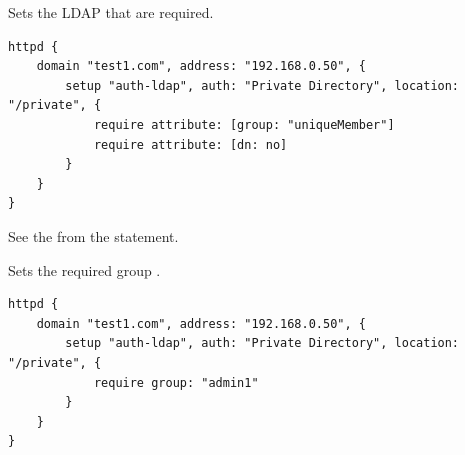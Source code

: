 Sets the LDAP  that are required.

\begin{lstlisting}[style=Java]
httpd {
    domain "test1.com", address: "192.168.0.50", {
        setup "auth-ldap", auth: "Private Directory", location: "/private", {
            require attribute: [group: "uniqueMember"]
            require attribute: [dn: no]
        }
    }
}
\end{lstlisting}


See the 
from the  statement.


Sets the required  group .

\begin{lstlisting}[style=Java]
httpd {
    domain "test1.com", address: "192.168.0.50", {
        setup "auth-ldap", auth: "Private Directory", location: "/private", {
            require group: "admin1"
        }
    }
}
\end{lstlisting}
